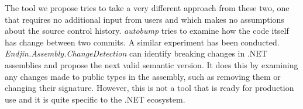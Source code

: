 \documentclass{l4proj}
\begin{document}
The tool we propose tries to take a very different approach from these two,
one that requires no additional input from users and which makes no
assumptions about the source control history. \textit{autobump} tries
to examine how the code itself has change between two commits. A
similar experiment has been conducted.
\textit{Endjin.Assembly.ChangeDetection}\cite{Endjin} can identify
breaking changes in .NET assemblies and propose the next valid
semantic version. It does this by examining any changes made to public
types in the assembly, such as removing them or changing their
signature. However, this is not a tool that is ready for production
use and it is quite specific to the .NET ecosystem.




\end{document}
